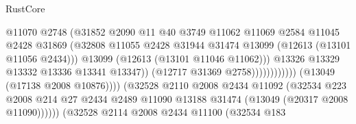\begin{lexlean}{RustCore}
\begin{coremodule}
                                                    @11070
                                                    @2748
                                                    (@31852
                                                      @2090
                                                      @11
                                                      @40
                                                      @3749
                                                      @11062
                                                      @11069
                                                      @2584
                                                      @11045
                                                      @2428
                                                      @31869
                                                      (@32808
                                                        @11055
                                                        @2428
                                                        @31944
                                                        @31474
                                                        @13099
                                                        (@12613 (@13101 @11056 @2434)))
                                                      @13099
                                                      (@12613 (@13101 @11046 @11062)))
                                                    @13326
                                                    @13329
                                                    @13332
                                                    @13336
                                                    @13341
                                                    @13347))
                                                (@12717 @31369 @2758))))))))))))
                          (@13049 (@17138 @2008 @10876))))
                      (@32528
                        @2110
                        @2008
                        @2434
                        @11092
                        (@32534
                          @223
                          @2008
                          @214
                          @27
                          @2434
                          @2489
                          @11090
                          @13188
                          @31474
                          (@13049 (@20317 @2008 @11090))))))
                  (@32528
                    @2114
                    @2008
                    @2434
                    @11100
                    (@32534
                      @183

\end{coremodule}
\end{lexlean}
